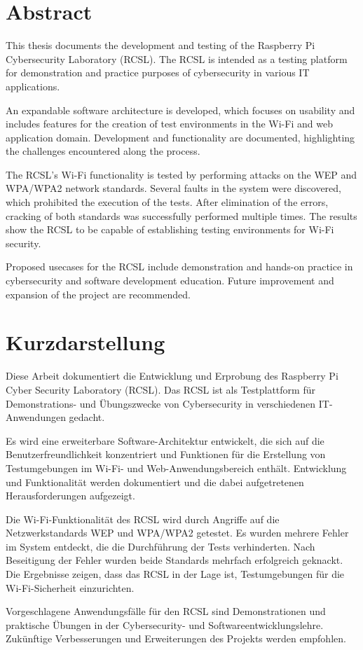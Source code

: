 \thispagestyle{empty}

\section*{Abstract}\label{sec:abstract}
This thesis documents the development and testing of the Raspberry Pi Cybersecurity Laboratory (RCSL).
The RCSL is intended as a testing platform for demonstration and practice purposes of cybersecurity in various IT applications.

An expandable software architecture is developed, which focuses on usability and includes features for the creation of test environments in the Wi-Fi and web application domain.
Development and functionality are documented, highlighting the challenges encountered along the process.

The RCSL's Wi-Fi functionality is tested by performing attacks on the WEP and WPA/WPA2 network standards.
Several faults in the system were discovered, which prohibited the execution of the tests.
After elimination of the errors, cracking of both standards was successfully performed multiple times.
The results show the RCSL to be capable of establishing testing environments for Wi-Fi security.

Proposed usecases for the RCSL include demonstration and hands-on practice in cybersecurity and software development education.
Future improvement and expansion of the project are recommended.


\newpage
\thispagestyle{empty}
\mbox{}  %
\newpage

\section*{Kurzdarstellung}
\label{sec:kurzdarstellung}
Diese Arbeit dokumentiert die Entwicklung und Erprobung des Raspberry Pi Cyber Security Laboratory (RCSL).
Das RCSL ist als Testplattform für Demonstrations- und Übungszwecke von Cybersecurity in verschiedenen IT-Anwendungen gedacht.

Es wird eine erweiterbare Software-Architektur entwickelt, die sich auf die Benutzerfreundlichkeit konzentriert und Funktionen für die Erstellung von Testumgebungen im Wi-Fi- und Web-Anwendungsbereich enthält.
Entwicklung und Funktionalität werden dokumentiert und die dabei aufgetretenen Herausforderungen aufgezeigt.

Die Wi-Fi-Funktionalität des RCSL wird durch Angriffe auf die Netzwerkstandards WEP und WPA/WPA2 getestet.
Es wurden mehrere Fehler im System entdeckt, die die Durchführung der Tests verhinderten.
Nach Beseitigung der Fehler wurden beide Standards mehrfach erfolgreich geknackt.
Die Ergebnisse zeigen, dass das RCSL in der Lage ist, Testumgebungen für die Wi-Fi-Sicherheit einzurichten.

Vorgeschlagene Anwendungsfälle für den RCSL sind Demonstrationen und praktische Übungen in der Cybersecurity- und Softwareentwicklungslehre.
Zukünftige Verbesserungen und Erweiterungen des Projekts werden empfohlen.